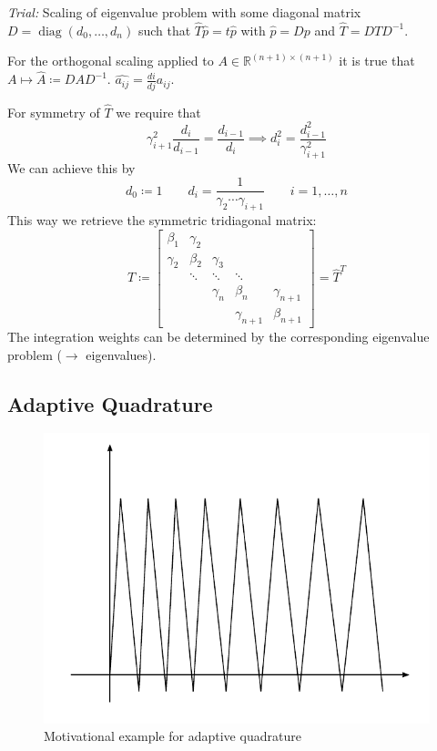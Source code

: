 \documentclass[a4paper]{article}
\numberwithin{lecref}{section}
\theoremstyle{break}
\DeclareMathOperator{\diag}{diag}
\begin{document}
\emph{Trial:} Scaling of eigenvalue problem with some diagonal matrix $D = \diag(d_0, \dots, d_n)$ such that $\hat{T} \hat{p} = t \hat{p}$ with $\hat{p} = Dp$ and $\hat{T} = DTD^{-1}$.

For the orthogonal scaling applied to $A \in \mathbb R^{(n+1) \times (n+1)}$ it is true that $A \mapsto \hat{A} \coloneqq D A D^{-1}$. $\hat{a_{ij}} = \frac{di}{dj} a_{ij}$.

For symmetry of $\hat{T}$ we require that
\[ \gamma^2_{i+1} \frac{d_i}{d_{i-1}} = \frac{d_{i-1}}{d_{i}} \implies d_i^2 = \frac{d_{i-1}^2}{\gamma_{i+1}^2} \]
We can achieve this by
\[ d_0 \coloneqq 1 \qquad d_i = \frac{1}{\gamma_2 \cdots \gamma_{i+1}} \qquad i = 1, \dots, n \]
This way we retrieve the symmetric tridiagonal matrix:
\[
  T \coloneqq \begin{bmatrix}
    \beta_1    & \gamma_2&            &                & \\
    \gamma_2   & \beta_2 & \gamma_3   &                & \\
               & \ddots  & \ddots     & \ddots         & \\
               &         & \gamma_n   & \beta_n        & \gamma_{n+1} \\
               &         &            & \gamma_{n+1}   & \beta_{n+1}
  \end{bmatrix}
  = \hat{T}^T
\]
The integration weights can be determined by the corresponding eigenvalue problem ($\to$ eigenvalues).

\subsection{Adaptive Quadrature}
\label{ch:5-4}

\begin{figure}[!ht]
  \begin{center}
    \includegraphics{img/adaptive_quadrature.pdf}
    \caption{Motivational example for adaptive quadrature}
    \label{img:adaptive-quadrature}
  \end{center}
\end{figure}
\end{document}
